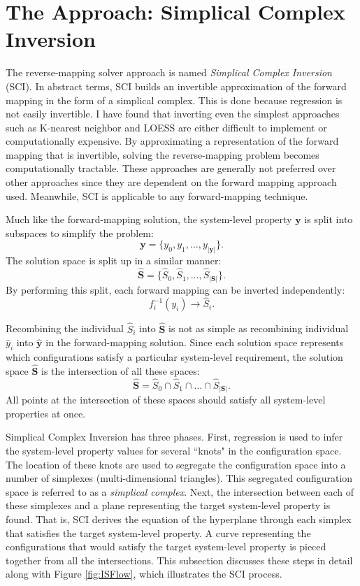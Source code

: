 \section{The \fw Approach: Simplical Complex Inversion}
The \fw reverse-mapping solver approach is named \textit{Simplical Complex Inversion} (SCI).
In abstract terms, SCI builds an invertible approximation of the forward mapping in the form of a simplical complex. This is done because regression is not easily invertible.
I have found that inverting even the simplest approaches such as K-nearest neighbor and LOESS are either difficult to implement or computationally expensive.
By approximating a representation of the forward mapping that is invertible, solving the reverse-mapping problem becomes computationally tractable.
These approaches are generally not preferred over other approaches since they are dependent on the forward mapping approach used.
Meanwhile, SCI is applicable to any forward-mapping technique.

Much like the forward-mapping solution, the system-level property $\mathbf y$ is split into subspaces to simplify the problem:
\[ \mathbf y = \{y_0, y_1, \ldots, y_{|\mathbf y|}\}. \]
The solution space is split up in a similar manner:
\[ \hat{\mathbf S} = \{\hat S_0, \hat S_1, \ldots, \hat S_{|\mathbf S|}\}. \]
By performing this split, each forward mapping can be inverted independently:
\[ f^{-1}_i(y_i) \rightarrow \hat S_i. \]

Recombining the individual $\hat S_i$ into $\hat{\mathbf S}$ is not as simple as recombining individual $\hat y_i$ into $\hat{\mathbf y}$ in the forward-mapping solution.
Since each solution space represents which configurations satisfy a particular system-level requirement, the solution space $\hat{\mathbf S}$ is the intersection of all these spaces:
\[ \hat{\mathbf S} = \hat S_0 \cap \hat S_1 \cap \ldots \cap \hat S_{|\mathbf S|}.\]
All points at the intersection of these spaces should satisfy all system-level properties at once.

Simplical Complex Inversion has three phases.
First, regression is used to infer the system-level property values for several ``knots" in the configuration space.
The location of these knots are used to segregate the configuration space into a number of simplexes (multi-dimensional triangles).
This segregated configuration space is referred to as a \textit{simplical complex}.
Next, the intersection between each of these simplexes and a plane representing the target system-level property is found.
That is, SCI derives the equation of the hyperplane through each simplex that satisfies the target system-level property.
A curve representing the configurations that would satisfy the target system-level property is pieced together from all the intersections.
This subsection discusses these steps in detail along with Figure \ref{fig:ISFlow}, which illustrates the SCI process.


